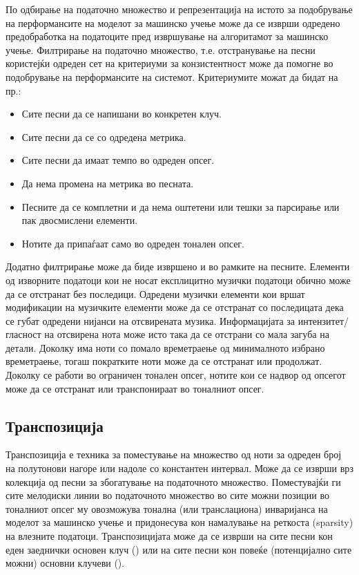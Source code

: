 По одбирање на податочно множество и репрезентација на истото за подобрување на перформансите на моделот за машинско учење може да се изврши одредено предобработка на податоците пред извршување на алгоритамот за машинско учење. Филтрирање на податочно множество, т.е. отстранување на песни користејќи одреден сет на критериуми за конзистентност може да помогне во подобрување на перформансите на системот. Критериумите можат да бидат на пр.:
\begin{itemize}
    \item Сите песни да се напишани во конкретен клуч.
    \item Сите песни да се со одредена метрика.
    \item Сите песни да имаат темпо во одреден опсег.
    \item Да нема промена на метрика во песната.
    \item Песните да се комплетни и да нема оштетени или тешки за парсирање или пак двосмислени елементи.
    \item Нотите да припаѓаат само во одреден тонален опсег.
\end{itemize}

Додатно филтрирање може да биде извршено и во рамките на песните. Елементи од изворните податоци кои не носат експлицитно музички податоци обично може да се отстранат без последици. Одредени музички елементи кои вршат модификации на музичките елементи може да се отстранат со последицата дека се губат одредени нијанси на отсвирената музика. Информацијата за интензитет/гласност на отсвирена нота може исто така да се отстрани со мала загуба на детали. Доколку има ноти со помало времетраење од минималното избрано времетраење, тогаш пократките ноти може да се отстранат или продолжат. Доколку се работи во ограничен тонален опсег, нотите кои се надвор од опсегот може да се отстранат или транспонираат во тоналниот опсег.

\subsection{Транспозиција}

Транспозиција е техника за поместување на множество од ноти за одреден број на полутонови нагоре или надоле со константен интервал. Може да се изврши врз колекција од песни за збогатување на податочното множество. Поместувајќи ги сите мелодиски линии во податочното множество во сите можни позиции во тоналниот опсег му овозможува тонална (или транслациона) инваријанса на моделот за машинско учење и придонесува кон намалување на реткоста (sparsity) на влезните податоци. Транспозицијата може да се изврши на сите песни кон еден заеднички основен клуч (\cite{Sturm2016,Tikhonov2017}) или на сите песни кон повеќе (потенцијално сите можни) основни клучеви (\cite{Yang2017,Bretan2016}).

